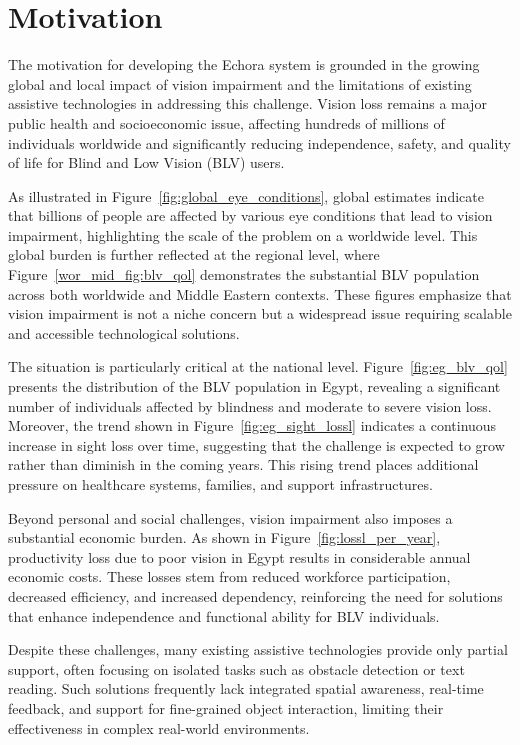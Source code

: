 \section{Motivation}

The motivation for developing the Echora system is grounded in the growing global and local impact of vision impairment and the limitations of existing assistive technologies in addressing this challenge. Vision loss remains a major public health and socioeconomic issue, affecting hundreds of millions of individuals worldwide and significantly reducing independence, safety, and quality of life for Blind and Low Vision (BLV) users.

As illustrated in Figure~\ref{fig:global_eye_conditions}, global estimates indicate that billions of people are affected by various eye conditions that lead to vision impairment, highlighting the scale of the problem on a worldwide level. This global burden is further reflected at the regional level, where Figure~\ref{wor_mid_fig:blv_qol} demonstrates the substantial BLV population across both worldwide and Middle Eastern contexts. These figures emphasize that vision impairment is not a niche concern but a widespread issue requiring scalable and accessible technological solutions.

The situation is particularly critical at the national level. Figure~\ref{fig:eg_blv_qol} presents the distribution of the BLV population in Egypt, revealing a significant number of individuals affected by blindness and moderate to severe vision loss. Moreover, the trend shown in Figure~\ref{fig:eg_sight_lossl} indicates a continuous increase in sight loss over time, suggesting that the challenge is expected to grow rather than diminish in the coming years. This rising trend places additional pressure on healthcare systems, families, and support infrastructures.

Beyond personal and social challenges, vision impairment also imposes a substantial economic burden. As shown in Figure~\ref{fig:lossl_per_year}, productivity loss due to poor vision in Egypt results in considerable annual economic costs. These losses stem from reduced workforce participation, decreased efficiency, and increased dependency, reinforcing the need for solutions that enhance independence and functional ability for BLV individuals.

Despite these challenges, many existing assistive technologies provide only partial support, often focusing on isolated tasks such as obstacle detection or text reading. Such solutions frequently lack integrated spatial awareness, real-time feedback, and support for fine-grained object interaction, limiting their effectiveness in complex real-world environments.

